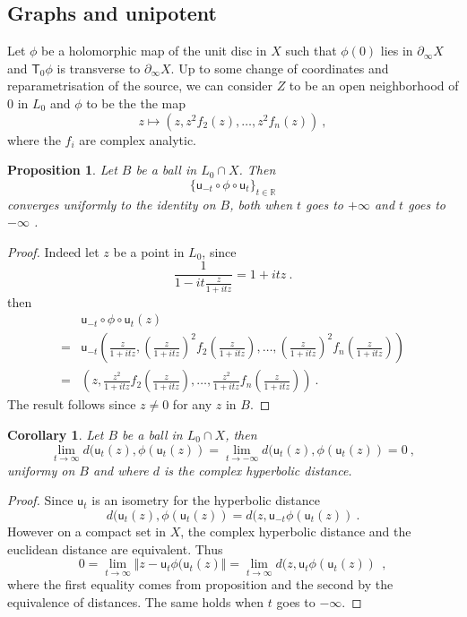 \documentclass[12pt,reqno]{amsart}
\newtheorem{proposition}[theorem]{Proposition}
\newtheorem{corollary}[theorem]{Corollary}
\newcommand{\T}{\ms T}
\newcommand{\ms}{\mathsf}
\newcommand{\bX}{\partial_\infty X}
\newcommand{\uu}{\mathsf u}
\begin{document}
\subsection{Graphs and unipotent}
Let $\phi$ be a holomorphic map of the unit disc in $X$ such that $\phi(0)$ lies in $\bX$ and $\T_0\phi$ is transverse to $\bX$. Up to some change of coordinates and reparametrisation of the source, we can consider  $Z$ to be  an open neighborhood of $0$ in $L_0$ and $\phi$ to be the  the map
$$
z\mapsto(z,z^2f_2(z),\ldots,z^2f_n(z))\ ,
$$
where the $f_i$ are complex analytic.
\begin{proposition}\label{pro:conv0uni}
	Let $B$ be a ball in $L_0\cap X$. Then 
	$$
	\{\uu_{-t}\circ \phi\circ \uu_t\}_{t\in\mathbb R}
	$$
	converges uniformly to the identity  on $B$, both when $t$ goes to $+\infty$ and $t$ goes to $-\infty$  .
\end{proposition}
\begin{proof}
	Indeed let $z$ be a point in $L_0$, since  $$
	\frac{1}{1-it\frac{z}{1+itz}}=1+itz\ .
	$$ then 
\begin{align*}
	&\uu_{-t}\circ \phi\circ \uu_t(z)\\=&\uu_{-t}\left(\frac{z}{1+itz}, \left(\frac{z}{1+itz}\right)^2 f_2\left(\frac{z}{1+itz}\right),\ldots,\left(\frac{z}{1+itz}\right)^2 f_n\left(\frac{z}{1+itz}\right) \right)\\
=&\left(z,\frac{z^2}{1+itz} f_2\left(\frac{z}{1+itz}\right),\ldots, \frac{z^2}{1+itz} f_n\left(\frac{z}{1+itz}\right) \right)\ .
\end{align*}
The result follows since $z\not= 0$ for any $z$ in  $B$.
\end{proof}

\begin{corollary}\label{coro:dd}
Let $B$ be a ball in $L_0\cap X$, then
$$
\lim_{t\to\infty} d(\uu_{t}(z),\phi(\uu_t(z)) =\lim_{t\to-\infty} d(\uu_{t}(z),\phi(\uu_t(z))=0\ ,
$$	
uniformy on $B$ and where $d$ is the complex hyperbolic distance.\end{corollary}
\begin{proof} Since $\uu_t$ is an isometry for the hyperbolic distance 
$$
d(\uu_t(z),\phi(\uu_t(z)) =d(z,\uu_{-t}\phi(\uu_t(z))\ .
$$	
However on a compact set in $X$, the complex hyperbolic distance and the euclidean distance are equivalent.
Thus
$$
0=\lim_{t\to\infty}
\Vert z- \uu_t\phi(\uu_t(z)\Vert=\lim_{t\to\infty}d(z, \uu_t\phi(\uu_t(z))\ \ ,
$$
where the first equality comes from proposition \label{pro:conv0euc} and the second by the equivalence of distances. The same holds when $t$ goes to $-\infty$.
\end{proof}
\end{document}

